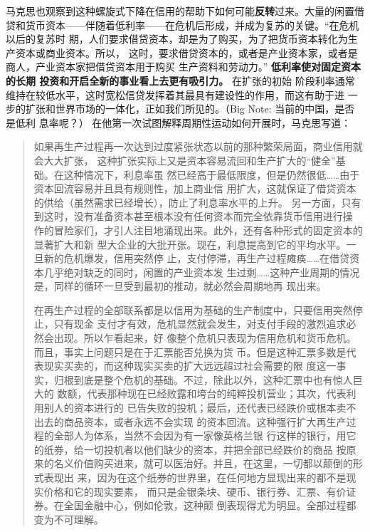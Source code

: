 马克思也观察到这种螺旋式下降在信用的帮助下如何可能\textbf{反转}过来。大量的闲置借
贷和货币资本——伴随着低利率——在危机后形成，并成为复苏的关键。“在危机以后的复苏时
期，人们要求借贷资本，却是为了购买，为了把货币资本转化为生产资本或商业资本。所以，
这时，要求借贷资本的，或者是产业资本家，或者是商人，产业资本家把借贷资本用于购买
生产资料和劳动力。” \textbf{低利率使对固定资本的长期
  投资和开启全新的事业看上去更有吸引力。} 在扩张的初始
阶段利率通常维持在较低水平，这时宽松信贷发挥着其最具有建设性的作用，而这有助于进
一步的扩张和世界市场的一体化，正如我们所见的。（Big Note: 当前的中国，是否是低利
息率呢？）
在他第一次试图解释周期性运动如何开展时，马克思写道：

\begin{quotation}
  如果再生产过程再一次达到过度紧张状态以前的那种繁荣局面，商业信用就会大大扩张，
  这种扩张实际上又是资本容易流回和生产扩大的“健全”基础。在这种情况下，利息率虽
  然已经高于最低限度，但是仍然很低……由于资本回流容易并且具有规则性，加上商业信
  用扩大，这就保证了借贷资本的供给（虽然需求已经增长），防止了利息率水平的上升。
  另一方面，只有到这时，没有准备资本甚至根本没有任何资本而完全依靠货币信用进行操
  作的冒险家们，才引人注目地涌现出来。此外，还有各种形式的固定资本的显著扩大和新
  型大企业的大批开张。现在，利息提高到它的平均水平。一旦新的危机爆发，信用突然停
  止，支付停滞，再生产过程瘫痪……在借贷资本几乎绝对缺乏的同时，闲置的产业资本发
  生过剩……这种产业周期的情况是，同样的循环一旦受到最初的推动，就必然会周期地再
  现出来。 

  
  在再生产过程的全部联系都是以信用为基础的生产制度中，只要信用突然停止，只有现金
  支付才有效，危机显然就会发生，对支付手段的激烈追求必然会出现。所以乍看起来，好
  像整个危机只表现为信用危机和货币危机。而且，事实上问题只是在于汇票能否兑换为货
  币。但是这种汇票多数是代表现实买卖的，而这种现实买卖的扩大远远超过社会需要的限
  度这一事实，归根到底是整个危机的基础。不过，除此以外，这种汇票中也有惊人巨大的
  数额，代表那种现在已经败露和垮台的纯粹投机营业；其次，代表利用别人的资本进行的
  已告失败的投机；最后，还代表已经跌价或根本卖不出去的商品资本，或者永远不会实现
  的资本回流。这种强行扩大再生产过程的全部人为体系，当然不会因为有一家像英格兰银
  行这样的银行，用它的纸券，给一切投机者以他们缺少的资本，并把全部已经跌价的商品
  按原来的名义价值购买进来，就可以医治好。并且，在这里，一切都以颠倒的形式表现出
  来，因为在这个纸券的世界里，在任何地方显现出来的都不是现实价格和它的现实要素，
  而只是金银条块、硬币、银行券、汇票、有价证券。在全国金融中心，例如伦敦，这种颠
  倒表现得尤为明显。全部过程都变为不可理解。



\end{quotation}
